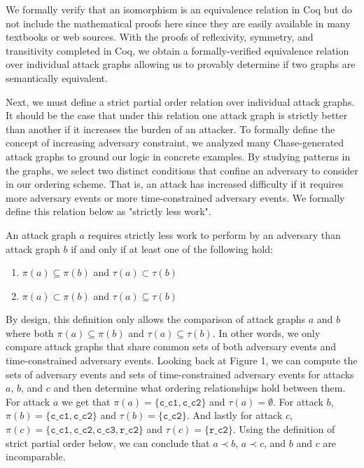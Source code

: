 \documentclass[runningheads]{llncs}
\theoremstyle{definition}
\newcommand{\squash}{\itemsep=0pt\parskip=0pt}
\begin{document}
\noindent We formally verify that an isomorphism is an equivalence relation in Coq but do not include the mathematical proofs here since they are easily available in many textbooks or web sources. With the proofs of reflexivity, symmetry, and transitivity completed in Coq, we obtain a formally-verified equivalence relation over individual attack graphs allowing us to provably determine if two graphs are semantically equivalent.


Next, we must define a strict partial order relation over individual attack graphs. It should be the case that under this relation one attack graph is strictly better than another if it increases the burden of an attacker. To formally define the concept of increasing adversary constraint, we analyzed many Chase-generated attack graphs to ground our logic in concrete examples. By studying patterns in the graphs, we select two distinct conditions that confine an adversary to consider in our ordering scheme. That is, an attack has increased difficulty if it requires more adversary events or more time-constrained adversary events. We formally define this relation below as "strictly less work".

\begin{definition}
  An attack graph $a$ requires strictly less work to perform by an adversary than attack graph $b$ if and only if at least one of the following hold: 
\begin{enumerate}
  \squash
  \item $\pi(a) \subseteq \pi(b)$ and $\tau(a) \subset \tau(b)$
  \item $\pi(a) \subset \pi(b)$ and $\tau(a) \subseteq \tau(b)$
\end{enumerate}
\end{definition}

\noindent By design, this definition only allows the comparison of attack graphs $a$ and $b$ where both $\pi(a) \subseteq \pi(b)$ and $\tau(a) \subseteq \tau(b)$. In other words, we only compare attack graphs that share common sets of both adversary events and time-constrained adversary events. Looking back at Figure 1, we can compute the sets of adversary events and sets of time-constrained adversary events for attacks $a$, $b$, and $c$ and then determine what ordering relationships hold between them. For attack $a$ we get that $\pi(a) = \{ \texttt{c\_c1}, \texttt{c\_c2} \}$ and $\tau(a) = \emptyset$. For attack $b$, $\pi(b) = \{ \texttt{c\_c1}, \texttt{c\_c2} \}$ and $\tau(b) = \{ \texttt{c\_c2} \}$. And lastly for attack $c$, $\pi(c) = \{ \texttt{c\_c1}, \texttt{c\_c2}, \texttt{c\_c3}, \texttt{r\_c2} \}$ and $\tau(c) = \{ \texttt{r\_c2} \}$. Using the definition of strict partial order below, we can conclude that $a \prec b$, $a \prec c$, and $b$ and $c$ are incomparable.
\end{document}

